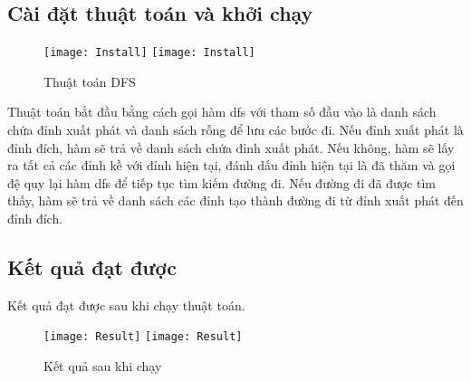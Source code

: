 \subsection{Cài đặt thuật toán và khởi chạy}
\begin{figure}[!htbp]
\begin{center}
    \leavevmode
    \ifpdf
      \texttt{[image: Install]}
    \else
      \texttt{[image: Install]}
    \fi
    \caption{Thuật toán DFS}
    \label{FigAir}
  \end{center}
\end{figure}
\FloatBarrier
Thuật toán bắt đầu bằng cách gọi hàm dfs với tham số đầu vào là danh sách chứa đỉnh xuất phát và danh sách rỗng để lưu các bước đi. Nếu đỉnh xuất phát là đỉnh đích, hàm sẽ trả về danh sách chứa đỉnh xuất phát. Nếu không, hàm sẽ lấy ra tất cả các đỉnh kề với đỉnh hiện tại, đánh dấu đỉnh hiện tại là đã thăm và gọi đệ quy lại hàm dfs để tiếp tục tìm kiếm đường đi. Nếu đường đi đã được tìm thấy, hàm sẽ trả về danh sách các đỉnh tạo thành đường đi từ đỉnh xuất phát đến đỉnh đích.\\
\subsection{Kết quả đạt được}
Kết quả đạt được sau khi chạy thuật toán.\\
\begin{figure}[!htbp]
\begin{center}
    \leavevmode
    \ifpdf
      \texttt{[image: Result]}
    \else
      \texttt{[image: Result]}
    \fi
    \caption{Kết quả sau khi chạy}
    \label{FigAir}
  \end{center}
\end{figure}
\FloatBarrier


